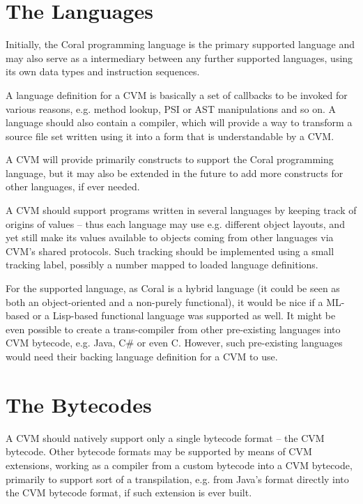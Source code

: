 \section{The Languages}

Initially, the Coral programming language is the primary supported language and may also serve as a intermediary between any further supported languages, using its own data types and instruction sequences. 

A language definition for a CVM is basically a set of callbacks to be invoked for various reasons, e.g. method lookup, PSI or AST manipulations and so on. A language should also contain a compiler, which will provide a way to transform a source file set written using it into a form that is understandable by a CVM. 

A CVM will provide primarily constructs to support the Coral programming language, but it may also be extended in the future to add more constructs for other languages, if ever needed. 

A CVM should support programs written in several languages by keeping track of origins of values -- thus each language may use e.g. different object layouts, and yet still make its values available to objects coming from other languages via CVM's shared protocols. Such tracking should be implemented using a small tracking label, possibly a number mapped to loaded language definitions. 

For the supported language, as Coral is a hybrid language (it could be seen as both an object-oriented and a non-purely functional), it would be nice if a ML-based or a Lisp-based functional language was supported as well. It might be even possible to create a trans-compiler from other pre-existing languages into CVM bytecode, e.g. Java, C\# or even C. However, such pre-existing languages would need their backing language definition for a CVM to use. 





\section{The Bytecodes}

A CVM should natively support only a single bytecode format -- the CVM bytecode. Other bytecode formats may be supported by means of CVM extensions, working as a compiler from a custom bytecode into a CVM bytecode, primarily to support sort of a transpilation, e.g. from Java's  format directly into the CVM bytecode format, if such extension is ever built. 

